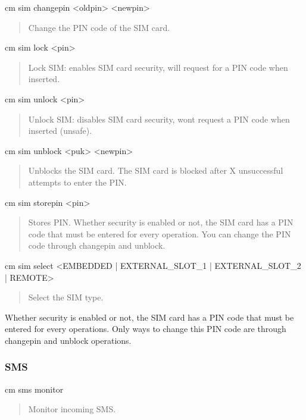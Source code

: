 \begin{DoxyVerb}cm sim changepin <oldpin> <newpin> \end{DoxyVerb}
 \begin{quote}
Change the P\+I\+N code of the S\+I\+M card. \end{quote}


\begin{DoxyVerb}cm sim lock <pin> \end{DoxyVerb}
 \begin{quote}
Lock S\+I\+M\+: enables S\+I\+M card security, will request for a P\+I\+N code when inserted. \end{quote}


\begin{DoxyVerb}cm sim unlock <pin> \end{DoxyVerb}
 \begin{quote}
Unlock S\+I\+M\+: disables S\+I\+M card security, won\textquotesingle{}t request a P\+I\+N code when inserted (unsafe). \end{quote}


\begin{DoxyVerb}cm sim unblock <puk> <newpin> \end{DoxyVerb}
 \begin{quote}
Unblocks the S\+I\+M card. The S\+I\+M card is blocked after X unsuccessful attempts to enter the P\+I\+N. \end{quote}


\begin{DoxyVerb}cm sim storepin <pin> \end{DoxyVerb}
 \begin{quote}
Stores P\+I\+N. Whether security is enabled or not, the S\+I\+M card has a P\+I\+N code that must be entered for every operation. You can change the P\+I\+N code through {\ttfamily changepin} and {\ttfamily unblock}. \end{quote}


\begin{DoxyVerb}cm sim select <EMBEDDED | EXTERNAL_SLOT_1 | EXTERNAL_SLOT_2 | REMOTE> \end{DoxyVerb}
 \begin{quote}
Select the S\+I\+M type. \end{quote}


Whether security is enabled or not, the S\+I\+M card has a P\+I\+N code that must be entered for every operations. Only ways to change this P\+I\+N code are through \textquotesingle{}changepin\textquotesingle{} and \textquotesingle{}unblock\textquotesingle{} operations.\hypertarget{tools_target_cm_toolsTarget_cm_sms}{}\subsubsection{S\+M\+S}\label{tools_target_cm_toolsTarget_cm_sms}
\begin{DoxyVerb}cm sms monitor \end{DoxyVerb}
 \begin{quote}
Monitor incoming S\+M\+S. \end{quote}


